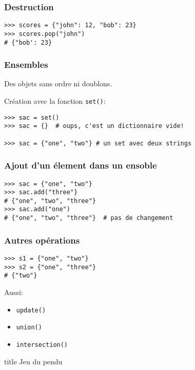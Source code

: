 \documentclass{beamer}
\begin{document}
\begin{frame}[fragile]
  \frametitle{Destruction}

\begin{lstlisting}
>>> scores = {"john": 12, "bob": 23}
>>> scores.pop("john")
# {"bob': 23}
\end{lstlisting}

\end{frame}

\begin{frame}[fragile]
  \frametitle{Ensembles}
Des objets sans ordre ni doublons.

Création avec la fonction \texttt{set()}:

\begin{lstlisting}
>>> sac = set()
>>> sac = {}  # oups, c'est un dictionnaire vide!

>>> sac = {"one", "two"} # un set avec deux strings
\end{lstlisting}
\end{frame}

\begin{frame}[fragile]
  \frametitle{Ajout d'un élement dans un ensoble}
\begin{lstlisting}
>>> sac = {"one", "two"}
>>> sac.add("three"}
# {"one", "two", "three"}
>>> sac.add("one")
# {"one", "two", "three"}  # pas de changement
\end{lstlisting}
\end{frame}

\begin{frame}[fragile]
  \frametitle{Autres opérations}
\begin{lstlisting}
>>> s1 = {"one", "two"}
>>> s2 = {"one", "three"}
# {"two"}
\end{lstlisting}

Aussi:

\begin{itemize}
  \item \texttt{update()}
  \item \texttt{union()}
  \item \texttt{intersection()}
\end{itemize}
\end{frame}

\begin{frame}[fragile]

  \begin{beamercolorbox}[sep=8pt,center,shadow=true,rounded=true]{title}
    Jeu du pendu
  \end{beamercolorbox}

\end{frame}
\end{document}
